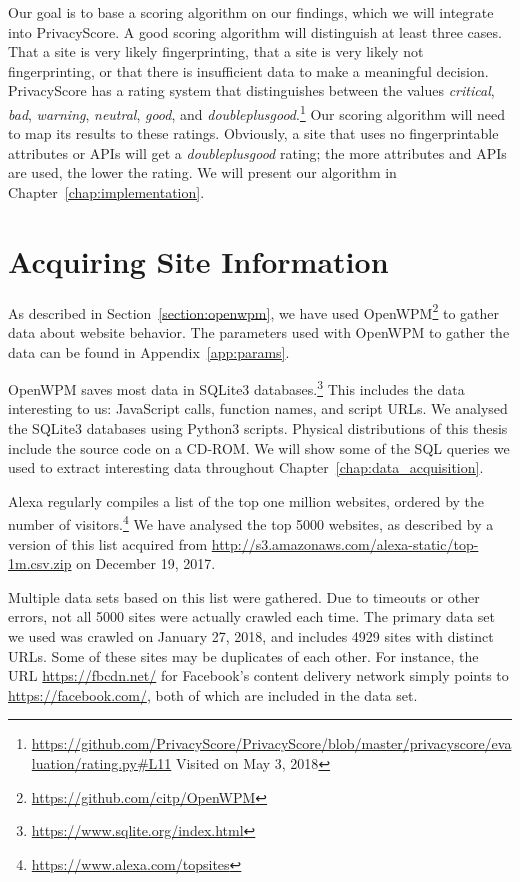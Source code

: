 \documentclass[
    fontsize=12pt,
    headings=small,
    parskip=half,
    bibliography=totoc,
    numbers=noenddot,
    open=any
    ]{scrreprt}
\begin{document}
Our goal is to base a scoring algorithm on our findings, which we will integrate into PrivacyScore.
A good scoring algorithm will distinguish at least three cases. That a site is very likely fingerprinting,
that a site is very likely not fingerprinting, or that there is insufficient data to make a meaningful decision.
PrivacyScore has a rating system that distinguishes between the values
\textit{critical}, \textit{bad}, \textit{warning}, \textit{neutral}, \textit{good},
and \textit{doubleplusgood}.\footnote{\url{https://github.com/PrivacyScore/PrivacyScore/blob/master/privacyscore/evaluation/rating.py\#L11} Visited on May 3, 2018}
Our scoring algorithm will need to map its results to these ratings. Obviously, a site that uses no fingerprintable
attributes or APIs will get a \textit{doubleplusgood} rating; the more attributes and APIs are used, the lower the rating.
We will present our algorithm in Chapter~\ref{chap:implementation}.

\section{Acquiring Site Information}
\label{sec:acquiring_information}
As described in Section~\ref{section:openwpm}, we have used OpenWPM\footnote{\url{https://github.com/citp/OpenWPM}} to gather data about
website behavior.
The parameters used with OpenWPM to gather the data can be found in Appendix~\ref{app:params}.

OpenWPM saves most data in SQLite3 databases.\footnote{\url{https://www.sqlite.org/index.html}}
This includes the data interesting to us: JavaScript calls, function names, and script URLs.
We analysed the SQLite3 databases using Python3 scripts.
Physical distributions of this thesis include the source code on a CD-ROM.
We will show some of the SQL queries we used to extract interesting data throughout Chapter~\ref{chap:data_acquisition}.

Alexa regularly compiles a list of the top one million websites, ordered by the number of
visitors.\footnote{\url{https://www.alexa.com/topsites}}
We have analysed the top 5000 websites, as described by a version of this list acquired from
\url{http://s3.amazonaws.com/alexa-static/top-1m.csv.zip} on December 19, 2017.

Multiple data sets based on this list were gathered. Due to timeouts or other
errors, not all 5000 sites were actually crawled each time.
The primary data set we used was crawled on January 27, 2018, and includes 4929 sites with distinct URLs. Some of these sites
may be duplicates of each other. For instance, the URL \url{https://fbcdn.net/} for Facebook's content delivery
network simply points to \url{https://facebook.com/}, both of which are included in the data set.
\end{document}
